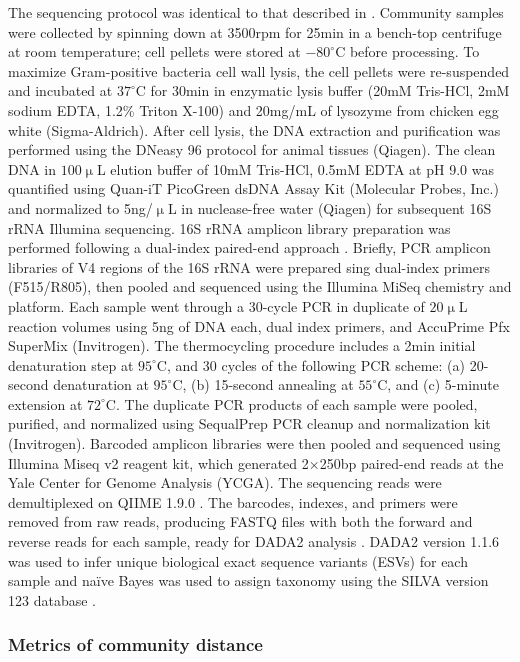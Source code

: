 \documentclass[a4paper,10pt]{article}
\begin{document}
The sequencing protocol was identical to that described in \cite{Goldford2018}.
Community samples were collected by spinning down at 3500rpm for 25min
in a bench-top centrifuge at room temperature;
cell pellets were stored at $-80^\circ$C before processing.
To maximize Gram-positive bacteria cell wall lysis,
the cell pellets were re-suspended and incubated at $37^\circ$C for 30min
in enzymatic lysis buffer (20mM Tris-HCl, 2mM sodium EDTA, 1.2\% Triton X-100)
and 20mg/mL of lysozyme from chicken egg white (Sigma-Aldrich).
After cell lysis, the DNA extraction and purification was performed using the
DNeasy 96 protocol for animal tissues (Qiagen).
The clean DNA in $100\upmu$L elution buffer of 10mM Tris-HCl, 0.5mM EDTA
at pH 9.0 was quantified using Quan-iT PicoGreen dsDNA Assay Kit
(Molecular Probes, Inc.)
and normalized to 5ng/$\upmu$L in nuclease-free water (Qiagen)
for subsequent 16S rRNA Illumina sequencing.
16S rRNA amplicon library preparation was performed following a dual-index
paired-end approach \cite{Kozich2013}.
Briefly, PCR amplicon libraries of V4 regions of the 16S rRNA were prepared 
sing dual-index primers (F515/R805), then pooled and sequenced
using the Illumina MiSeq chemistry and platform.
Each sample went through a 30-cycle PCR in duplicate of $20\upmu$L
reaction volumes using 5ng of DNA each, dual index primers, and AccuPrime Pfx SuperMix (Invitrogen).
The thermocycling procedure includes a 2min initial denaturation step at
$95^\circ$C, and 30 cycles of the following PCR scheme:
(a) 20-second denaturation at $95^\circ$C,
(b) 15-second annealing at $55^\circ$C,
and (c) 5-minute extension at $72^\circ$C.
The duplicate PCR products of each sample were pooled, purified, and normalized
using SequalPrep PCR cleanup and normalization kit (Invitrogen).
Barcoded amplicon libraries were then pooled and sequenced using
Illumina Miseq v2 reagent kit, which generated 2$\times$250bp paired-end reads
at the Yale Center for Genome Analysis (YCGA).
The sequencing reads were demultiplexed on QIIME 1.9.0 \cite{Caporaso2010}.
The barcodes, indexes, and primers were removed from raw reads,
producing FASTQ files with both the forward and reverse reads for each sample,
ready for DADA2 analysis \cite{Callahan2017}.
DADA2 version 1.1.6 was used to infer unique biological exact sequence variants
(ESVs) for each sample
and na{\"i}ve Bayes was used to assign taxonomy using the SILVA version 123
database \cite{Wang2007,Quast2013}.

\subsubsection*{Metrics of community distance}
\label{methods:metrics}
\end{document}
